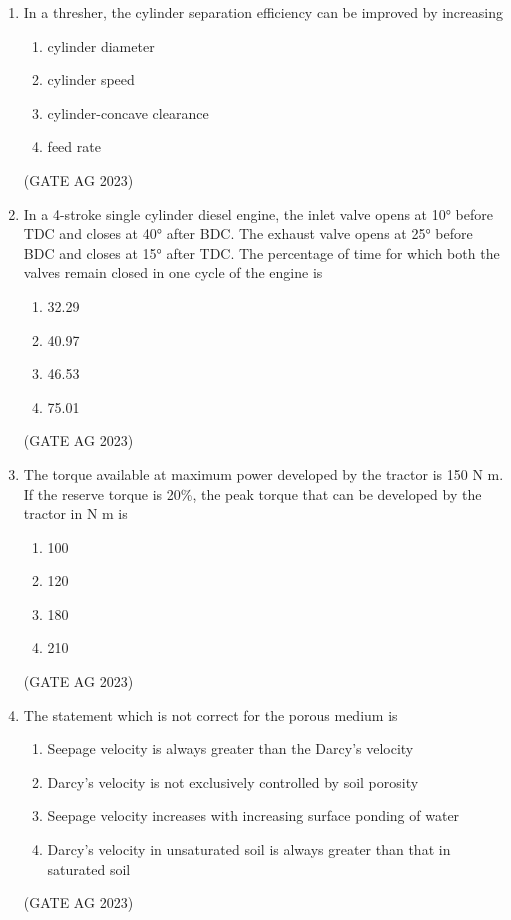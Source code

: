 \documentclass[journal,12pt,onecolumn]{IEEEtran}
\theoremstyle{remark}
\begin{document}
\begin{enumerate}
\item In a thresher, the cylinder separation efficiency can be improved by increasing
\begin{enumerate}
    \item cylinder diameter
    \item cylinder speed
    \item cylinder-concave clearance
    \item feed rate
\end{enumerate}
\hfill{(GATE AG 2023)}

\item In a 4-stroke single cylinder diesel engine, the inlet valve opens at 10° before TDC and closes at 40° after BDC. The exhaust valve opens at 25° before BDC and closes at 15° after TDC. The percentage of time for which both the valves remain closed in one cycle of the engine is
\begin{enumerate}
    \item 32.29
    \item 40.97
    \item 46.53
    \item 75.01
\end{enumerate}
\hfill{(GATE AG 2023)}

\item The torque available at maximum power developed by the tractor is 150 N m. If the reserve torque is 20\%, the peak torque that can be developed by the tractor in N m is
\begin{enumerate}
    \item 100
    \item 120
    \item 180
    \item 210
\end{enumerate}
\hfill{(GATE AG 2023)}

\item The statement which is not correct for the porous medium is
\begin{enumerate}
    \item Seepage velocity is always greater than the Darcy's velocity
    \item Darcy's velocity is not exclusively controlled by soil porosity
    \item Seepage velocity increases with increasing surface ponding of water
    \item Darcy's velocity in unsaturated soil is always greater than that in saturated soil
\end{enumerate}
\hfill{(GATE AG 2023)}


\end{enumerate}
\end{document}
